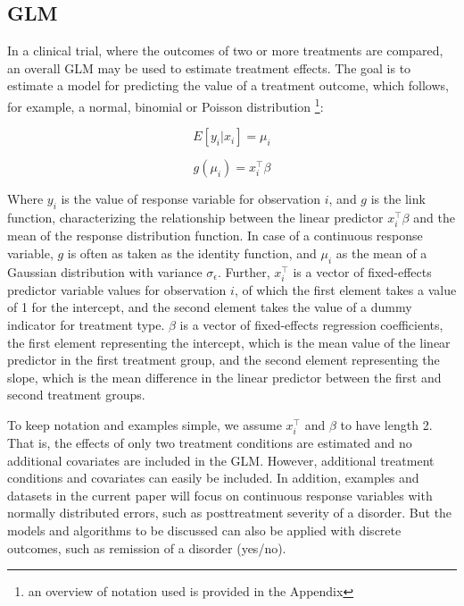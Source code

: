 \documentclass[nobf,doc]{apa}
\begin{document}
\subsection{GLM}
In a clinical trial, where the outcomes of two or more treatments are compared, an overall GLM may be used to estimate treatment effects. The goal is to estimate a model for predicting the value of a treatment outcome, which follows, for example, a normal, binomial or Poisson distribution \footnote{ an overview of notation used is provided in the Appendix}:

\begin{equation}
\label{eq:expected_value}
	E[y_i | x_i] = \mu_i 
\end{equation}

\begin{equation}
\label{eq:fixedeffects}
	g(\mu_{i}) = x_{i}^{\top}\beta 
\end{equation}

Where $y_i$ is the value of response variable for observation $i$, and $g$ is the link function, characterizing the relationship between the linear predictor $x_{i}^{\top}\beta$ and the mean of the response distribution function. In case of a continuous response variable, $g$ is often as taken as the identity function, and $\mu_{i}$ as the mean of a Gaussian distribution with variance $\sigma_{\epsilon}$. Further, $x_{i}^{\top}$ is a vector of fixed-effects predictor variable values for observation $i$, of which the first element takes a value of 1 for the intercept, and the second element takes the value of a dummy indicator for treatment type. $\beta$ is a vector of fixed-effects regression coefficients, the first element representing the intercept, which is the mean value of the linear predictor in the first treatment group, and the second element representing the slope, which is the mean difference in the linear predictor between the first and second treatment groups.  

To keep notation and examples simple, we assume $x_{i}^{\top}$ and $\beta$ to have length 2. That is, the effects of only two treatment conditions are estimated and no additional covariates are included in the GLM. However, additional treatment conditions and covariates can easily be included. In addition, examples and datasets in the current paper will focus on continuous response variables with normally distributed errors, such as posttreatment severity of a disorder. But the models and algorithms to be discussed can also be applied with discrete outcomes, such as remission of a disorder (yes/no).
\end{document}

